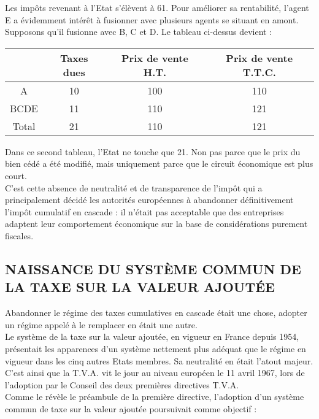 \documentclass{book}
\begin{document}
\null 

Les impôts revenant à l'Etat s'élèvent à 61. Pour améliorer sa rentabilité, l'agent E a
évidemment intérêt à fusionner avec plusieurs agents se situant en amont. Supposons qu'il
fusionne avec B, C et D. Le tableau ci-dessus devient :\\
	
\begin{tabular}{|c|c|c|c|}
  \hline
  & Taxes dues & Prix de vente H.T. & Prix de vente T.T.C. \\
  \hline
  A & 10 & 100 & 110\\
    \hline
BCDE & 11 & 110 & 121\\
  \hline
Total & 21 & 110 & 121\\
  \hline
\end{tabular}

\null 

Dans ce second tableau, l'Etat ne touche que 21. Non pas parce que le prix du bien cédé a été
modifié, mais uniquement parce que le circuit économique est plus court.\\

C'est cette absence de neutralité et de transparence de l'impôt qui a principalement décidé les
autorités européennes à abandonner définitivement l'impôt cumulatif en cascade : il n'était pas
acceptable que des entreprises adaptent leur comportement économique sur la base de
considérations purement fiscales.

\subsection{NAISSANCE DU SYSTÈME COMMUN DE LA TAXE SUR LA VALEUR AJOUTÉE}

Abandonner le régime des taxes cumulatives en cascade était une chose, adopter un régime
appelé à le remplacer en était une autre.\\

Le système de la taxe sur la valeur ajoutée, en vigueur en France depuis 1954, présentait les
apparences d'un système nettement plus adéquat que le régime en vigueur dans les cinq autres
Etats membres. Sa neutralité en était l’atout majeur.\\

C'est ainsi que la T.V.A. vit le jour au niveau européen le 11 avril 1967, lors de l'adoption par
le Conseil des deux premières directives T.V.A.\\

Comme le révèle le préambule de la première directive, l'adoption d'un système commun de
taxe sur la valeur ajoutée poursuivait comme objectif :\\
\end{document}
